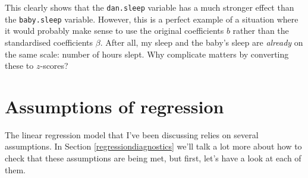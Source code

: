 \documentclass[
]{book}
\begin{document}
This clearly shows that the \texttt{dan.sleep} variable has a much stronger effect than the \texttt{baby.sleep} variable. However, this is a perfect example of a situation where it would probably make sense to use the original coefficients \(b\) rather than the standardised coefficients \(\beta\). After all, my sleep and the baby's sleep are \emph{already} on the same scale: number of hours slept. Why complicate matters by converting these to \(z\)-scores?

\hypertarget{regressionassumptions}{%
\section{Assumptions of regression}\label{regressionassumptions}}

The linear regression model that I've been discussing relies on several assumptions. In Section \ref{regressiondiagnostics} we'll talk a lot more about how to check that these assumptions are being met, but first, let's have a look at each of them.
\end{document}
